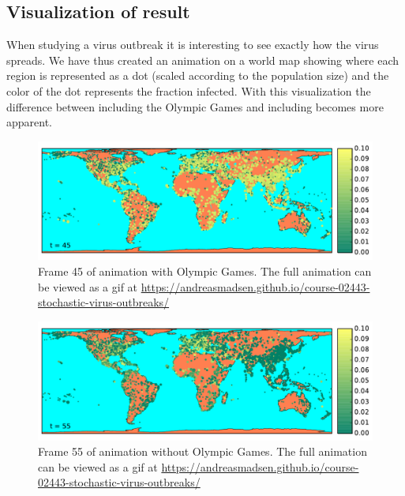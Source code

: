 
\subsection{Visualization of result}
When studying a virus outbreak it is interesting to see exactly how the virus spreads. We have thus created an animation on a world map showing where each region is represented as a dot (scaled according to the population size) and the color of the dot represents the fraction infected. With this visualization the difference between including the Olympic Games and including becomes more apparent.

\begin{figure}[H]
	\centering
	\includegraphics[width=1.0 \linewidth]{plots/gifs/frames/rio-45}
	\caption{Frame 45 of animation with Olympic Games. The full animation can be viewed as a gif at
		\url{https://andreasmadsen.github.io/course-02443-stochastic-virus-outbreaks/}}
\end{figure}

\begin{figure}[H]
	\centering
	\includegraphics[width=1.0 \linewidth]{plots/gifs/frames/noRio-55}
	\caption{Frame 55 of animation without Olympic Games. The full animation can be viewed as a gif at
		\url{https://andreasmadsen.github.io/course-02443-stochastic-virus-outbreaks/}}
\end{figure}


